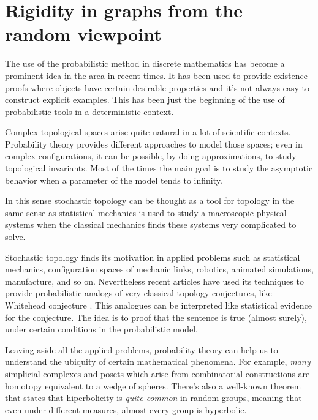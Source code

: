 
\chapter{Rigidity in graphs from the random viewpoint} %

\label{Chapter2} %



The use of the probabilistic method in discrete mathematics has become a prominent idea in the area in recent times. It has been used to provide existence proofs where objects have certain desirable properties and it's not always easy to construct explicit examples. This has been just the beginning of the use of probabilistic tools in a deterministic context.

Complex topological spaces arise quite natural in a lot of scientific contexts. Probability theory provides different approaches to model those spaces; even in complex configurations, it can be possible, by doing approximations, to study topological invariants. Most of the times the main goal is to study the asymptotic behavior when a parameter of the model tends to infinity. 

In this sense stochastic topology can be thought as a tool for topology in the same sense as statistical mechanics is used to study a macroscopic physical systems when the classical mechanics finds these systems very complicated to solve.

Stochastic topology finds its motivation in applied problems such as statistical mechanics, configuration spaces of mechanic links, robotics, animated simulations, manufacture, and so on. Nevertheless recent articles have used its techniques to provide probabilistic analogs of very classical topology conjectures, like Whitehead conjecture \cite{Costa15}. This analogues can be interpreted like statistical evidence for the conjecture. The idea is to proof that the sentence is true (almost surely), under certain conditions in the probabilistic model.

Leaving aside all the applied problems, probability theory can help us to understand the ubiquity of certain mathematical phenomena. For example, \textit{many} simplicial complexes and posets which arise from combinatorial constructions are homotopy equivalent to a wedge of spheres. There's also a well-known theorem that states that hiperbolicity is \textit{quite common} in random groups, meaning that even under different measures, almost every group is hyperbolic.

